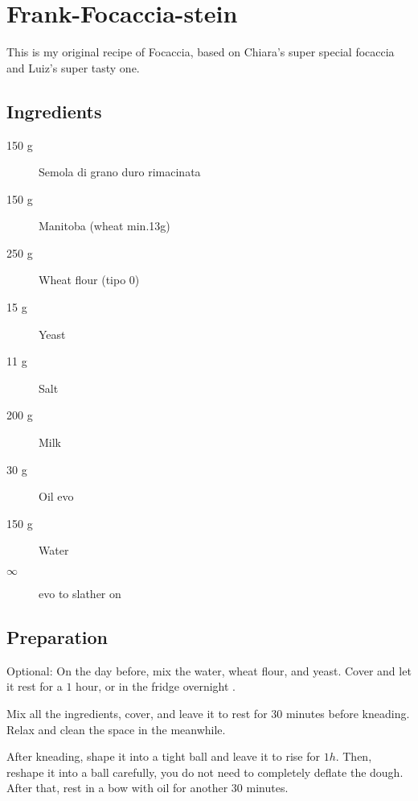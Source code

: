 \setchapterpreamble[u]{\margintoc}
\chapter{Frank-Focaccia-stein}

This is my original recipe of Focaccia, based on Chiara's super special focaccia and Luiz's super tasty one.

\section{Ingredients}

\begin{multicols}{2}
\begin{description}
	\item[150 g] Semola di grano duro rimacinata
	\item[150 g] Manitoba (wheat min.13g)
	\item[250 g] Wheat flour (tipo 0)
	
	\item[15 g] Yeast
	\item[11 g] Salt
	\item[200 g] Milk
	\item[30 g] Oil \gls{evo}
	
	
	\item[150 g] Water
	\item[$\infty$] \gls{evo} to slather on
\end{description}
\end{multicols}	

\section{Preparation}
Optional:
On the day before, mix the water, wheat flour, and yeast.
Cover and let it rest for a $1$ hour, or in the fridge overnight .

Mix all the ingredients, cover, and leave it to rest for $30$ minutes before kneading.
%
Relax and clean the space in the meanwhile.

After kneading, shape it into a tight ball and leave it to rise for $1h$.
%
Then, reshape it into a ball carefully, you do not need to completely deflate the dough.
%
After that, rest in a bow with oil for another $30$ minutes.

